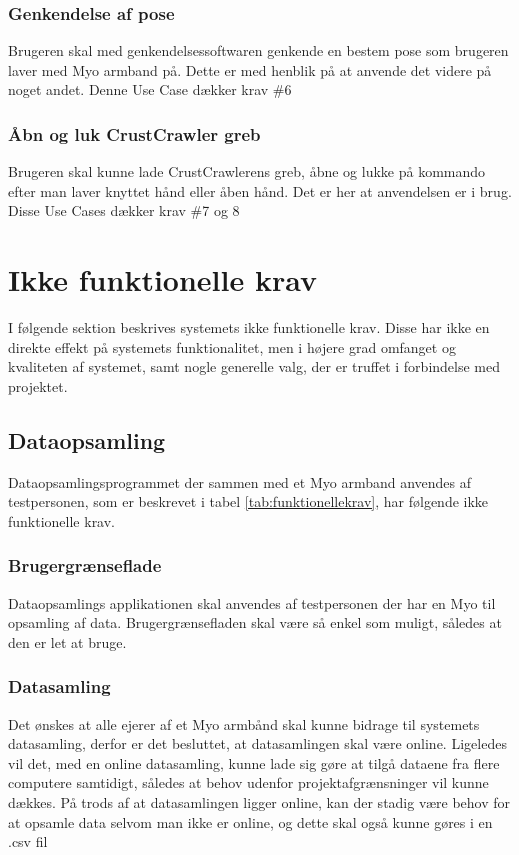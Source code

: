 \subsubsection{Genkendelse af pose}
Brugeren skal med genkendelsessoftwaren genkende en bestem pose som brugeren laver med Myo armband på. Dette er med henblik på at anvende det videre på noget andet. Denne Use Case dækker krav \#6
\subsubsection{Åbn og luk CrustCrawler greb}
Brugeren skal kunne lade CrustCrawlerens greb, åbne og lukke på kommando efter man laver knyttet hånd eller åben hånd. Det er her at anvendelsen er i brug. Disse Use Cases dækker krav \#7 og 8

\section{Ikke funktionelle krav}
\label{sec:ikkefunktionellekrav}
I følgende sektion beskrives systemets ikke funktionelle krav. Disse har ikke en direkte effekt på systemets funktionalitet, men i højere grad omfanget og kvaliteten af systemet, samt nogle generelle valg, der er truffet i forbindelse med projektet.

\subsection{Dataopsamling}
Dataopsamlingsprogrammet der sammen med et Myo armband anvendes af testpersonen, som er beskrevet i tabel \ref{tab:funktionellekrav}, har følgende ikke funktionelle krav.

\subsubsection{Brugergrænseflade}
Dataopsamlings applikationen skal anvendes af testpersonen der har en Myo til opsamling af data. Brugergrænsefladen skal være så enkel som muligt, således at den er let at bruge.

\subsubsection{Datasamling}
Det ønskes at alle ejerer af et Myo armbånd skal kunne bidrage til systemets datasamling, derfor er det besluttet, at datasamlingen skal være online. Ligeledes vil det, med en online datasamling, kunne lade sig gøre at tilgå dataene fra flere computere samtidigt, således at behov udenfor projektafgrænsninger vil kunne dækkes. På trods af at datasamlingen ligger online, kan der stadig være behov for at opsamle data selvom man ikke er online, og dette skal også kunne gøres i en .csv fil

